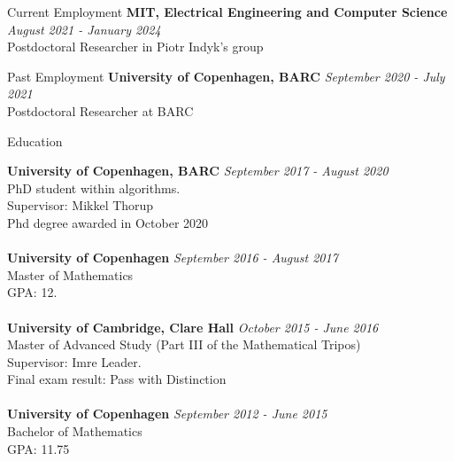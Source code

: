 \documentclass{resume} %
\begin{document}


\begin{rSection}{Current Employment}
{\bf MIT, Electrical Engineering and Computer Science} \hfill {\em August 2021 - January 2024} 
\\ Postdoctoral Researcher in Piotr Indyk's group


\end{rSection}

\begin{rSection}{Past Employment}
{\bf University of Copenhagen, BARC} \hfill {\em September 2020 - July 2021} 
\\ Postdoctoral Researcher at BARC


\end{rSection}



\begin{rSection}{Education}

{\bf University of Copenhagen, BARC} \hfill {\em September 2017 - August 2020} 
\\ PhD student within algorithms. \\Supervisor: Mikkel Thorup
\\ Phd degree awarded in October 2020\\
\\{\bf University of Copenhagen} \hfill {\em September 2016 - August 2017}  
\\ Master of Mathematics 
\\ GPA: 12. \\
\\{\bf University of Cambridge, Clare Hall} \hfill {\em October 2015 - June 2016} 
\\ Master of Advanced Study (Part III of the Mathematical Tripos)
\\ Supervisor: Imre Leader. 
\\ Final exam result: Pass with Distinction \\
\\{\bf University of Copenhagen} \hfill {\em September 2012 - June 2015} 
\\ Bachelor of Mathematics
\\ GPA: 11.75 
\end{rSection}
\end{document}
